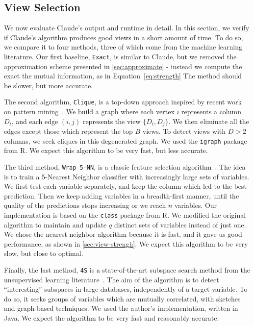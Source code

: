 \subsection{View Selection}
\label{sec:exp-view-selection} 

We now evaluate Claude's output and runtime in detail. In this section, we
verify if Claude's algorithm produces good views in a short amount of time. To
do so, we compare it to four methods, three of which come from the machine
learning literature.  Our first baseline, \texttt{Exact}, is similar to
Claude, but we removed the approximation scheme presented in
\ref{sec:approximate} - instead we compute the exact the mutual information, as
in Equation~\ref{eq:strength} The method should be slower, but more accurate. 

The second algorithm, \texttt{Clique}, is a top-down approach inspired by
recent work on pattern mining~\cite{xie2010max}. We build a graph where each
vertex $i$ represents a column $D_i$, and each edge $(i,j)$ represents the view
$\{D_i, D_j\}$. We then eliminate all the edges except those which represent
the top $B$ views. To detect views with $D>2$ columns, we seek cliques in this
degenerated graph. We used the \texttt{igraph} package from R. We expect this
algorithm to be very fast, but less accurate.

The third method, \texttt{Wrap 5-NN}, is a classic feature selection
algorithm~\cite{guyon2003introduction}. The idea is to train a 5-Nearest
Neighbor classifier with increasingly large sets of variables. We first test
each variable separately, and keep the column which led to the best prediction.
Then we keep adding variables in a breadth-first manner, until the
quality of the predictions stops increasing or we reach $n$ variables. Our
implementation is based on the \texttt{class} package from R.  We modified the
original algorithm to maintain and update $q$ distinct sets of variables
instead of just one. We chose the nearest neighbor algorithm because it is
fast, and it gave us good performance, as shown in \ref{sec:view-strengh}. We
expect this algorithm to be very slow, but close to optimal.

Finally, the last method, \texttt{4S} is a state-of-the-art subspace search
method from the unsupervised learning literature~\cite{nguyen20134s}. The aim
of the algorithm is to detect ``interesting'' subspaces in large databases,
independently of a target variable. To do so, it seeks groups of variables
which are mutually correlated, with sketches and graph-based techniques.  We
used the author's implementation, written in Java. We expect the algorithm to
be very fast and reasonably accurate.

